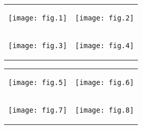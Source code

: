 \documentclass[a4paper,landscape]{article}
\begin{document}
\thispagestyle{empty}
\begin{tabular}{ c c } %
\begin{minipage}[t]{.5\textwidth}
    \begin{center}
    \texttt{[image: fig.1]}
    \end{center}
    \bigskip
\end{minipage}&
\begin{minipage}[t]{.5\textwidth}
    \begin{center}\texttt{[image: fig.2]}\end{center}
    \bigskip
\end{minipage}\\ %
\begin{minipage}[t]{.5\textwidth}
    \bigskip
    \begin{center}\texttt{[image: fig.3]}\end{center}
\end{minipage}&
\begin{minipage}[t]{.5\textwidth}
    \bigskip
    \begin{center}\texttt{[image: fig.4]}\end{center}
\end{minipage}\\ %
\end{tabular}
\newpage

\thispagestyle{empty}
\begin{tabular}{ c c } %
\begin{minipage}[t]{.5\textwidth}
    \bigskip
    \begin{center}\texttt{[image: fig.5]}\end{center}
\end{minipage}&
\begin{minipage}[t]{.5\textwidth}
    \bigskip
    \begin{center}\texttt{[image: fig.6]}\end{center}
\end{minipage}\\ %
\begin{minipage}[t]{.5\textwidth}
    \bigskip
    \begin{center}\texttt{[image: fig.7]}\end{center}
\end{minipage}&
\begin{minipage}[t]{.5\textwidth}
    \bigskip
    \begin{center}\texttt{[image: fig.8]}\end{center}
\end{minipage}\\ %
\end{tabular}
\end{document}
